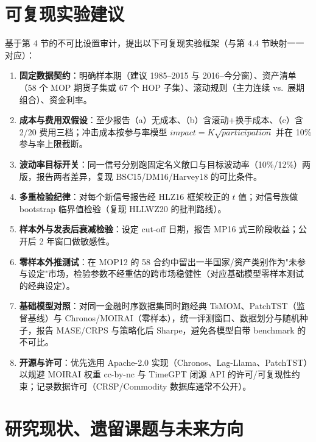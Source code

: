 \documentclass[11pt,a4paper]{article}
\begin{document}
\section{可复现实验建议}
基于第 4 节的不可比设置审计，提出以下可复现实验框架（与第 4.4 节映射一一对应）：
\begin{enumerate}
\item \textbf{固定数据契约}：明确样本期（建议 1985--2015 与 2016--今分窗）、资产清单（58 个 MOP 期货子集或 67 个 HOP 子集）、滚动规则（主力连续 vs.\ 展期组合）、资金利率。
\item \textbf{成本与费用双假设}：至少报告（a）无成本、（b）含滚动+换手成本、（c）含 2/20 费用三档；冲击成本按参与率模型 $impact=K\sqrt{participation}$ 并在 10\% 参与率上限截断。
\item \textbf{波动率目标开关}：同一信号分别跑固定名义敞口与目标波动率（10\%/12\%）两版，报告两者差异，复现 BSC15/DM16/Harvey18 的可比条件。
\item \textbf{多重检验纪律}：对每个新信号报告经 HLZ16 框架校正的 $t$ 值；对信号族做 bootstrap 临界值检验（复现 HLLWZ20 的批判路线）。
\item \textbf{样本外与发表后衰减检验}：设定 cut-off 日期，报告 MP16 式三阶段收益；公开后 2 年窗口做敏感性。
\item \textbf{零样本外推测试}：在 MOP12 的 58 合约中留出一半国家/资产类别作为"未参与设定"市场，检验参数不经重估的跨市场稳健性（对应基础模型零样本测试的经典设定）。
\item \textbf{基础模型对照}：对同一金融时序数据集同时跑经典 TsMOM、PatchTST（监督基线）与 Chronos/MOIRAI（零样本），统一评测窗口、数据划分与随机种子，报告 MASE/CRPS 与策略化后 Sharpe，避免各模型自带 benchmark 的不可比。
\item \textbf{开源与许可}：优先选用 Apache-2.0 实现（Chronos、Lag-Llama、PatchTST）以规避 MOIRAI 权重 cc-by-nc 与 TimeGPT 闭源 API 的许可/可复现性约束；记录数据许可（CRSP/Commodity 数据库通常不公开）。
\end{enumerate}

\section{研究现状、遗留课题与未来方向}
\end{document}
